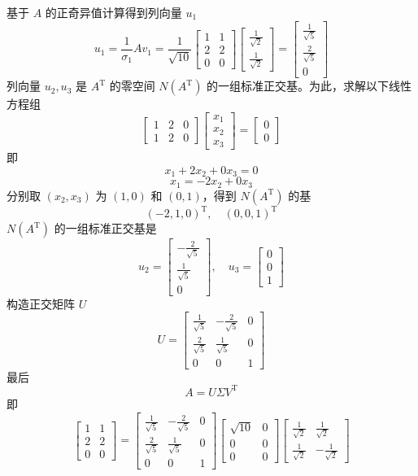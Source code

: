 \documentclass[UTF8, 12pt, fontset=fandol, oneside]{ctexart}
\begin{document}
基于 $A$ 的正奇异值计算得到列向量 $u_1$
\[
u_1=\frac{1}{\sigma_1}Av_1=
\frac{1}{\sqrt{10}}
\begin{bmatrix}
1&1\\
2&2\\
0&0
\end{bmatrix}
\begin{bmatrix}
\frac{1}{\sqrt2}\\[2mm]
\frac{1}{\sqrt2}
\end{bmatrix}
=
\begin{bmatrix}
\frac{1}{\sqrt5}\\[2mm]
\frac{2}{\sqrt5}\\[2mm]
0
\end{bmatrix}
\]
列向量 $u_2,u_3$ 是 $A^{\mathrm{T}}$ 的零空间 $N(A^{\mathrm{T}})$ 的一组标准正交基。为此，求解以下线性方程组
\[
\begin{bmatrix}
1&2&0\\
1&2&0
\end{bmatrix}
\begin{bmatrix}
x_1\\x_2\\x_3
\end{bmatrix}
=
\begin{bmatrix}
0\\0
\end{bmatrix}
\]
即
\[
x_1+2x_2+0x_3=0
\]
\[
x_1=-2x_2+0x_3
\]
分别取 $(x_2,x_3)$ 为 $(1,0)$ 和 $(0,1)$，得到 $N(A^{\mathrm{T}})$ 的基
\[
(-2,1,0)^{\mathrm{T}},\quad(0,0,1)^{\mathrm{T}}
\]
$N(A^{\mathrm{T}})$ 的一组标准正交基是
\[
u_2=\begin{bmatrix}-\frac{2}{\sqrt5}\\[2mm]\frac{1}{\sqrt5}\\[2mm]0\end{bmatrix},\quad
u_3=\begin{bmatrix}0\\0\\1\end{bmatrix}
\]
构造正交矩阵 $U$
\[
U=
\begin{bmatrix}
\frac{1}{\sqrt5}&-\frac{2}{\sqrt5}&0\\[2mm]
\frac{2}{\sqrt5}&\frac{1}{\sqrt5}&0\\[2mm]
0&0&1
\end{bmatrix}
\]
最后
\[
A=U\Sigma V^{\mathrm{T}}
\]
即
\[
\begin{bmatrix}
1&1\\
2&2\\
0&0
\end{bmatrix}
=
\begin{bmatrix}
\frac{1}{\sqrt5}&-\frac{2}{\sqrt5}&0\\[2mm]
\frac{2}{\sqrt5}&\frac{1}{\sqrt5}&0\\[2mm]
0&0&1
\end{bmatrix}
\begin{bmatrix}
\sqrt{10}&0\\
0&0\\
0&0
\end{bmatrix}
\begin{bmatrix}
\frac{1}{\sqrt2}&\frac{1}{\sqrt2}\\[2mm]
\frac{1}{\sqrt2}&-\frac{1}{\sqrt2}
\end{bmatrix}
\]
\end{document}
